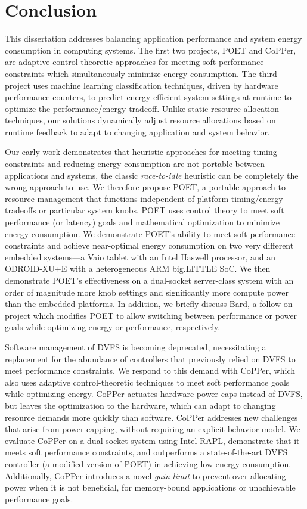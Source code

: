 \chapter{Conclusion}

This dissertation addresses balancing application performance and system energy consumption in computing systems.
The first two projects, POET and CoPPer, are adaptive control-theoretic approaches for meeting soft performance constraints which simultaneously minimize energy consumption.
The third project uses machine learning classification techniques, driven by hardware performance counters, to predict energy-efficient system settings at runtime to optimize the performance/energy tradeoff.
Unlike static resource allocation techniques, our solutions dynamically adjust resource allocations based on runtime feedback to adapt to changing application and system behavior.

Our early work demonstrates that heuristic approaches for meeting timing constraints and reducing energy consumption are not portable between applications and systems, \eg the classic \emph{race-to-idle} heuristic can be completely the wrong approach to use.
We therefore propose POET, a portable approach to resource management that functions independent of platform timing/energy tradeoffs or particular system knobs.
POET uses control theory to meet soft performance (or latency) goals and mathematical optimization to minimize energy consumption.
We demonstrate POET's ability to meet soft performance constraints and achieve near-optimal energy consumption on two very different embedded systems---a Vaio tablet with an Intel Haswell processor, and an ODROID-XU+E with a heterogeneous ARM big.LITTLE SoC.
We then demonstrate POET's effectiveness on a dual-socket server-class system with an order of magnitude more knob settings and significantly more compute power than the embedded platforms.
In addition, we briefly discuss Bard, a follow-on project which modifies POET to allow switching between performance or power goals while optimizing energy or performance, respectively.

Software management of DVFS is becoming deprecated, necessitating a replacement for the abundance of controllers that previously relied on DVFS to meet performance constraints.
We respond to this demand with CoPPer, which also uses adaptive control-theoretic techniques to meet soft performance goals while optimizing energy.
CoPPer actuates hardware power caps instead of DVFS, but leaves the optimization to the hardware, which can adapt to changing resource demands more quickly than software.
CoPPer addresses new challenges that arise from power capping, without requiring an explicit behavior model.
We evaluate CoPPer on a dual-socket system using Intel RAPL, demonstrate that it meets soft performance constraints, and outperforms a state-of-the-art DVFS controller (a modified version of POET) in achieving low energy consumption.
Additionally, CoPPer introduces a novel \emph{gain limit} to prevent over-allocating power when it is not beneficial, \eg for memory-bound applications or unachievable performance goals.

